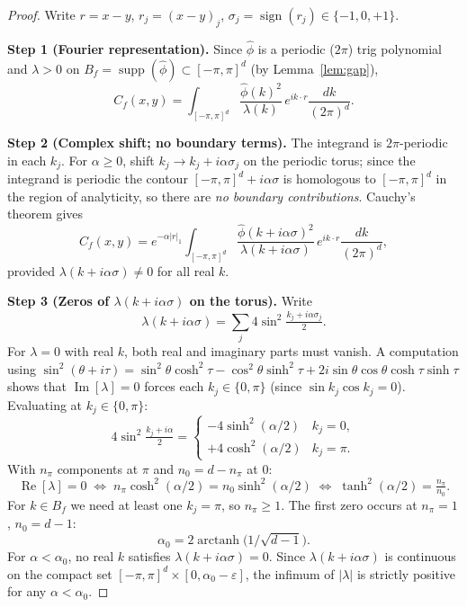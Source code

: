 \documentclass[11pt,a4paper]{amsart}
\theoremstyle{definition}
\newcommand{\Cf}{C_f}
\begin{document}
\begin{proof}
Write $r = x-y$, $r_j = (x-y)_j$, $\sigma_j = \operatorname{sign}(r_j)\in\{-1,0,+1\}$.

\textbf{Step 1 (Fourier representation).}
Since $\hat\phi$ is a periodic ($2\pi$) trig polynomial and $\lambda>0$ on
$B_f = \operatorname{supp}(\hat\phi)\subset[-\pi,\pi]^d$ (by Lemma~\ref{lem:gap}),
\begin{equation}\label{eq:Cf_fourier}
  \Cf(x,y)
  = \int_{[-\pi,\pi]^d} \frac{\hat\phi(k)^2}{\lambda(k)}\,e^{ik\cdot r}
    \frac{dk}{(2\pi)^d}.
\end{equation}

\textbf{Step 2 (Complex shift; no boundary terms).}
The integrand is $2\pi$-periodic in each $k_j$.
For $\alpha\ge 0$, shift $k_j\to k_j+i\alpha\sigma_j$ on the periodic torus;
since the integrand is periodic the contour $[-\pi,\pi]^d+i\alpha\sigma$
is homologous to $[-\pi,\pi]^d$ in the region of analyticity, so there are
\emph{no boundary contributions}.
Cauchy's theorem gives
\begin{equation}\label{eq:shifted}
  \Cf(x,y)
  = e^{-\alpha|r|_1}
    \int_{[-\pi,\pi]^d}
    \frac{\hat\phi(k+i\alpha\sigma)^2}{\lambda(k+i\alpha\sigma)}\,
    e^{ik\cdot r}\frac{dk}{(2\pi)^d},
\end{equation}
provided $\lambda(k+i\alpha\sigma)\ne 0$ for all real $k$.

\textbf{Step 3 (Zeros of $\lambda(k+i\alpha\sigma)$ on the torus).}
Write
\[
  \lambda(k+i\alpha\sigma)
  = \sum_j 4\sin^2\!\tfrac{k_j+i\alpha\sigma_j}{2}.
\]
For $\lambda = 0$ with real $k$, both real and imaginary parts must vanish.
A computation using $\sin^2(\theta+i\tau) = \sin^2\theta\cosh^2\!\tau - \cos^2\theta\sinh^2\!\tau
+ 2i\sin\theta\cos\theta\cosh\tau\sinh\tau$ shows that $\operatorname{Im}[\lambda]=0$
forces each $k_j\in\{0,\pi\}$ (since $\sin k_j\cos k_j=0$).
Evaluating at $k_j\in\{0,\pi\}$:
\[
  4\sin^2\!\tfrac{k_j+i\alpha}{2}
  = \begin{cases}
      -4\sinh^2(\alpha/2) & k_j=0,\\
      +4\cosh^2(\alpha/2) & k_j=\pi.
    \end{cases}
\]
With $n_\pi$ components at $\pi$ and $n_0 = d-n_\pi$ at $0$:
\[
  \operatorname{Re}[\lambda]=0
  \;\Leftrightarrow\;
  n_\pi\cosh^2(\alpha/2) = n_0\sinh^2(\alpha/2)
  \;\Leftrightarrow\;
  \tanh^2(\alpha/2) = \tfrac{n_\pi}{n_0}.
\]
For $k\in B_f$ we need at least one $k_j=\pi$, so $n_\pi\ge 1$.
The first zero occurs at $n_\pi=1$, $n_0=d-1$:
\[
  \alpha_0 = 2\operatorname{arctanh}\!\bigl(1/\sqrt{d-1}\bigr).
\]
For $\alpha<\alpha_0$, no real $k$ satisfies $\lambda(k+i\alpha\sigma)=0$.
Since $\lambda(k+i\alpha\sigma)$ is continuous on the compact set
$[-\pi,\pi]^d\times[0,\alpha_0-\varepsilon]$, the infimum of $|\lambda|$
is strictly positive for any $\alpha < \alpha_0$.


\end{proof}
\end{document}
